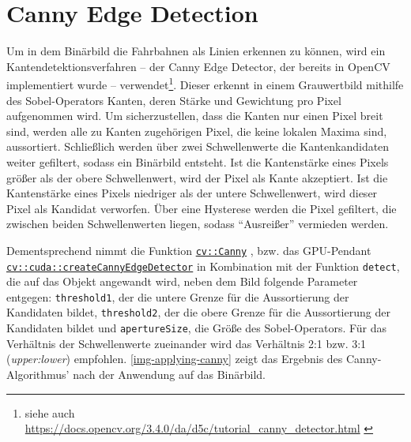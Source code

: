 \documentclass[a4paper,12pt]{report}
\begin{document}
\section{Canny Edge Detection}
	Um in dem Binärbild die Fahrbahnen als Linien erkennen zu können, wird ein Kantendetektionsverfahren -- der Canny Edge Detector, der bereits in OpenCV implementiert wurde -- verwendet\footnote{siehe auch \url{https://docs.opencv.org/3.4.0/da/d5c/tutorial_canny_detector.html} \cite{opencv-doc}}.
	Dieser erkennt in einem Grauwertbild mithilfe des Sobel-Operators Kanten, deren Stärke und Gewichtung pro Pixel aufgenommen wird.
	Um sicherzustellen, dass die Kanten nur einen Pixel breit sind, werden alle zu Kanten zugehörigen Pixel, die keine lokalen Maxima sind, aussortiert.
	Schließlich werden über zwei Schwellenwerte die Kantenkandidaten weiter gefiltert, sodass ein Binärbild entsteht.
	Ist die Kantenstärke eines Pixels größer als der obere Schwellenwert, wird der Pixel als Kante akzeptiert.
	Ist die Kantenstärke eines Pixels niedriger als der untere Schwellenwert, wird dieser Pixel als Kandidat verworfen.
	Über eine Hysterese werden die Pixel gefiltert, die zwischen beiden Schwellenwerten liegen, sodass "`Ausreißer"' vermieden werden.

	Dementsprechend nimmt die Funktion \href{https://docs.opencv.org/3.4.0/dd/d1a/group\_\_imgproc\_\_feature.html\#ga04723e007ed888ddf11d9ba04e2232de}{\texttt{cv::Canny}} \cite{opencv-doc}, bzw. das GPU-Pendant \href{https://docs.opencv.org/3.4.0/d0/d05/group\_\_cudaimgproc.html\#gabc17953de36faa404acb07dc587451fc}{\texttt{cv::cuda::createCannyEdgeDetector}} \cite{opencv-doc} in Kombination mit der Funktion \texttt{detect}, die auf das Objekt angewandt wird, neben dem Bild folgende Parameter entgegen: \texttt{threshold1}, der die untere Grenze für die Aussortierung der Kandidaten bildet, \texttt{threshold2}, der die obere Grenze für die Aussortierung der Kandidaten bildet und \texttt{apertureSize}, die Größe des Sobel-Operators.
	Für das Verhältnis der Schwellenwerte zueinander wird das Verhältnis 2:1 bzw. 3:1 (\textit{upper:lower}) empfohlen.
	\autoref{img-applying-canny} zeigt das Ergebnis des Canny-Algorithmus' nach der Anwendung auf das Binärbild.
\end{document}
